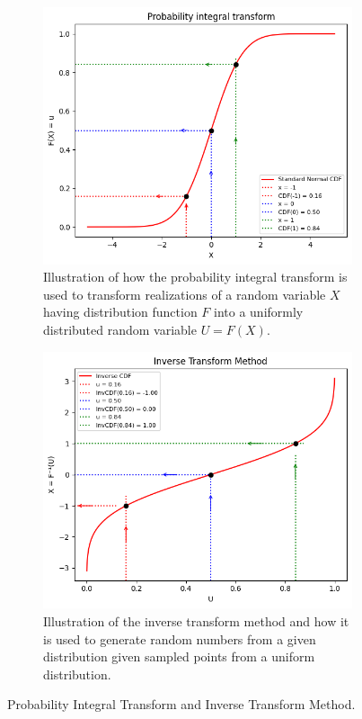 \begin{figure}[h]
    \centering
    \begin{subfigure}[t]{0.45\linewidth}
        \centering
        \includegraphics[width=\linewidth]{3Theory/pictures/ProbabilityIntegralTransform.png}
        \caption{Illustration of how the probability integral transform is used to transform realizations of a random variable $X$ having distribution function $F$ into a uniformly distributed random variable $U = F(X)$.}
        \label{fig:PIT}
    \end{subfigure}
    \hfill
    \begin{subfigure}[t]{0.45\linewidth}
        \centering
        \includegraphics[width=\linewidth]{3Theory/pictures/InverseTransformMethod.png}
        \caption{Illustration of the inverse transform method and how it is used to generate random numbers from a given distribution given sampled points from a uniform distribution.}
        \label{fig:ITM}
    \end{subfigure}
    \caption{Probability Integral Transform and Inverse Transform Method.}
    \label{fig:TransformMethods}
\end{figure}


